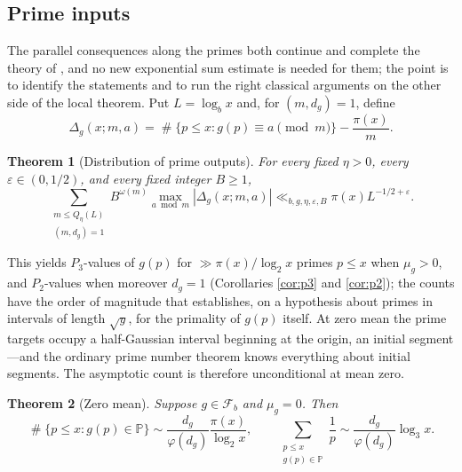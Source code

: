 \documentclass[11pt,reqno]{amsart}
\theoremstyle{plain}
\newtheorem{theorem}{Theorem}[section]
\theoremstyle{definition}
\newcommand{\Pp}{\mathbb{P}}
\newcommand{\eps}{\varepsilon}
\newcommand{\1}{\mathbf 1}
\DeclareMathOperator{\Card}{\#}
\begin{document}
\subsection{Prime inputs}
The parallel consequences along the primes both continue and complete the theory of \cite{vibefrtz}, and no new exponential sum estimate is needed for them; the point is to identify the statements and to run the right classical arguments on the other side of the local theorem. Put $L=\log_bx$ and, for $(m,d_g)=1$, define
\[
 \Delta_g(x;m,a)=\Card\{p\le x:g(p)\equiv a\pmod m\}-\frac{\pi(x)}m.
\]

\begin{theorem}[Distribution of prime outputs]\label{thm:output-level}
For every fixed $\eta>0$, every $\eps\in(0,1/2)$, and every fixed integer $B\ge1$,
\begin{equation}\label{eq:output-level}
 \sum_{\substack{m\le Q_\eta(L)\\(m,d_g)=1}}
 B^{\omega(m)}\max_{a\bmod m}|\Delta_g(x;m,a)|
 \ll_{b,g,\eta,\eps,B}
 \pi(x)L^{-1/2+\eps}.
\end{equation}
\end{theorem}

This yields $P_3$-values of $g(p)$ for $\gg\pi(x)/\log_2x$ primes $p\le x$ when $\mu_g>0$, and $P_2$-values when moreover $d_g=1$ (Corollaries \ref{cor:p3} and \ref{cor:p2}); the counts have the order of magnitude that \cite{vibefrtz} establishes, on a hypothesis about primes in intervals of length $\sqrt y$, for the primality of $g(p)$ itself. At zero mean the prime targets occupy a half-Gaussian interval beginning at the origin, an initial segment---and the ordinary prime number theorem knows everything about initial segments. The asymptotic count is therefore unconditional at mean zero.

\begin{theorem}[Zero mean]\label{thm:zero-mean-intro}
Suppose $g\in\mathcal F_b$ and $\mu_g=0$.  Then
\[
 \Card\{p\le x:g(p)\in\Pp\}
 \sim \frac{d_g}{\varphi(d_g)}\frac{\pi(x)}{\log_2x},
 \qquad
 \sum_{\substack{p\le x\\g(p)\in\Pp}}\frac1p
 \sim \frac{d_g}{\varphi(d_g)}\log_3x.
\]
\end{theorem}
\end{document}
